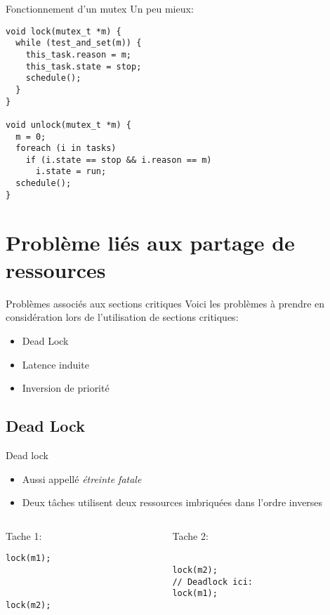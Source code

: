 \begin{frame}[fragile]{Fonctionnement d'un mutex}
  Un peu mieux:
  \begin{lstlisting} 
void lock(mutex_t *m) {
  while (test_and_set(m)) {
    this_task.reason = m;
    this_task.state = stop;
    schedule();
  }
}

void unlock(mutex_t *m) {
  m = 0;
  foreach (i in tasks)
    if (i.state == stop && i.reason == m)
      i.state = run;
  schedule();
}
  \end{lstlisting}
\end{frame} 

\section{Problème liés aux partage de ressources}

\begin{frame}{Problèmes associés aux sections critiques}
  Voici les problèmes à prendre en considération lors de l'utilisation
  de sections critiques:
  \begin{itemize}
  \item Dead Lock
  \item Latence induite
  \item Inversion de priorité
  \end{itemize} 
\end{frame}

\subsection{Dead Lock}

\begin{frame}[fragile]{Dead lock}
  \begin{itemize} 
  \item Aussi appellé \emph{étreinte fatale}
  \item Deux tâches utilisent  deux ressources imbriquées dans l'ordre
    inverses
  \end{itemize} 
  \begin{columns}
    \begin{column}{5cm}
      Tache 1:
      \begin{lstlisting}[showlines=true,emptylines=10]
lock(m1);



lock(m2);
      \end{lstlisting} 
    \end{column}
    \begin{column}{5cm}
      Tache 2:
      \begin{lstlisting}[showlines=true,emptylines=10]

lock(m2);
// Deadlock ici:
lock(m1);

      \end{lstlisting} 
    \end{column}
  \end{columns}
  \begin{center}
    
  \end{center}
\end{frame} 

